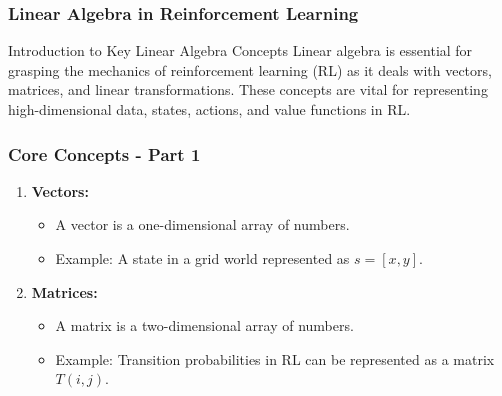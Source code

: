 \documentclass[aspectratio=169]{beamer}
\begin{document}
\begin{frame}[fragile]
    \frametitle{Linear Algebra in Reinforcement Learning}
    \begin{block}{Introduction to Key Linear Algebra Concepts}
        Linear algebra is essential for grasping the mechanics of reinforcement learning (RL) as it deals with vectors, matrices, and linear transformations. These concepts are vital for representing high-dimensional data, states, actions, and value functions in RL.
    \end{block}
\end{frame}

\begin{frame}[fragile]
    \frametitle{Core Concepts - Part 1}
    \begin{enumerate}
        \item \textbf{Vectors:}
            \begin{itemize}
                \item A vector is a one-dimensional array of numbers.
                \item Example: A state in a grid world represented as \(s = [x, y]\).
            \end{itemize}
        
        \item \textbf{Matrices:}
            \begin{itemize}
                \item A matrix is a two-dimensional array of numbers.
                \item Example: Transition probabilities in RL can be represented as a matrix \(T(i, j)\).
            \end{itemize}
    \end{enumerate}
\end{frame}
\end{document}
